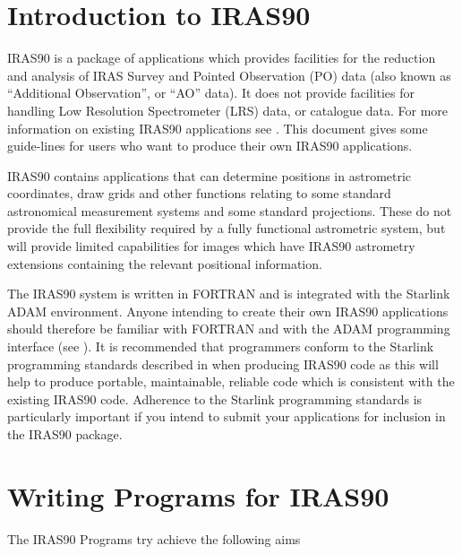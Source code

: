 \documentclass[twoside,11pt,nolof]{starlink}
\begin{document}
\scfrontmatter

\section{Introduction to IRAS90}

{\small IRAS90} is a package of applications which provides facilities
for the reduction and analysis of {\small IRAS} Survey and Pointed
Observation (PO) data (also known as ``Additional Observation'', or
``AO'' data). It does not provide facilities for handling Low
Resolution Spectrometer (LRS) data, or catalogue data. For more
information on existing {\small IRAS90} applications see
.  This
document gives some guide-lines for users who want to produce their own
{\small IRAS90} applications.

{\small IRAS90} contains applications that can determine positions in
astrometric coordinates, draw grids and other functions relating to some
standard astronomical measurement systems and some standard projections. These
do not provide the full flexibility required by a fully functional astrometric
system, but will provide limited capabilities for images which have {\small
IRAS90} astrometry extensions containing the relevant positional information.

The {\small IRAS90} system is written in {\small FORTRAN} and is
integrated with the Starlink {\small ADAM} environment. Anyone
intending to create their own {\small IRAS90} applications should
therefore be familiar with {\small FORTRAN} and with the {\small ADAM}
programming interface
(see ). It is recommended that programmers
conform to the Starlink programming standards described in
 when
producing {\small IRAS90} code as this will help to produce portable,
maintainable, reliable code which is consistent with the existing
{\small IRAS90} code. Adherence to the Starlink programming standards
is particularly important if you intend to submit your applications for
inclusion in the {\small IRAS90} package.

\section{Writing Programs for IRAS90
}

The {\small IRAS90} Programs try achieve the following aims
\end{document}

